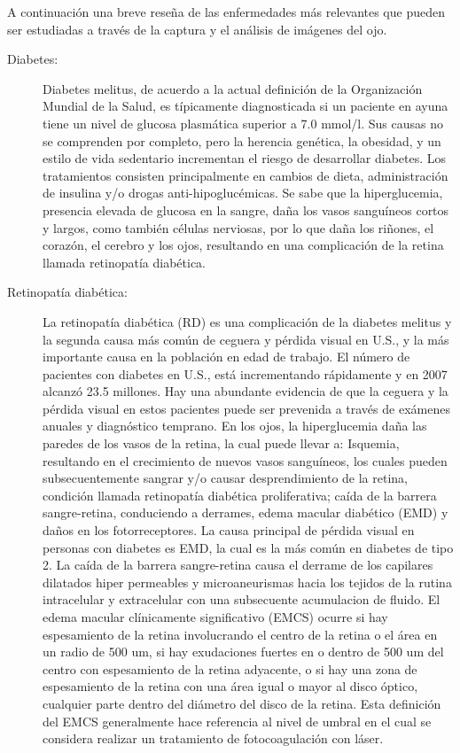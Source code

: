 A continuación una breve reseña de las enfermedades más relevantes que pueden ser estudiadas a través de la captura y el análisis de imágenes del ojo.

\begin{description}
    \item[Diabetes:] Diabetes melitus, de acuerdo a la actual definición de la Organización Mundial de la Salud, es típicamente diagnosticada si un paciente en ayuna tiene un nivel de glucosa plasmática superior a 7.0 mmol/l. Sus causas no se comprenden por completo, pero la herencia genética, la obesidad, y un estilo de vida sedentario incrementan el riesgo de desarrollar diabetes. Los tratamientos consisten principalmente en cambios de dieta, administración de insulina y/o drogas anti-hipoglucémicas. Se sabe que la hiperglucemia, presencia elevada de glucosa en la sangre, daña los vasos sanguíneos cortos y largos, como también células nerviosas, por lo que daña los riñones, el corazón, el cerebro y los ojos, resultando en una complicación de la retina llamada retinopatía diabética.
    \item[Retinopatía diabética:] La retinopatía diabética (RD) es una complicación de la diabetes melitus y la segunda causa más común de ceguera y pérdida visual en U.S., y la más importante causa en la población en edad de trabajo. El número de pacientes con diabetes en U.S., está incrementando rápidamente y en 2007 alcanzó 23.5 millones. Hay una abundante evidencia de que la ceguera y la pérdida visual en estos pacientes puede ser prevenida a través de exámenes anuales y  diagnóstico temprano. En los ojos, la hiperglucemia daña las paredes de los vasos de la retina, la cual puede llevar a:
Isquemia, resultando en el crecimiento de nuevos vasos sanguíneos, los cuales pueden subsecuentemente sangrar y/o causar desprendimiento de la retina, condición llamada retinopatía diabética proliferativa;
caída de la barrera sangre-retina, conduciendo a derrames, edema macular diabético (EMD) y daños en los fotorreceptores.
La causa principal de pérdida visual en personas con diabetes es EMD, la cual es la más común en diabetes de tipo 2. La caída de la barrera sangre-retina causa el derrame de los capilares dilatados hiper permeables y microaneurismas hacia los tejidos de la rutina intracelular y extracelular con una subsecuente acumulacion de fluido. El edema macular clínicamente significativo (EMCS) ocurre si hay espesamiento de la retina involucrando el centro de la retina o el área en un radio de 500 um, si hay exudaciones fuertes en o dentro de 500 um del centro con espesamiento de la retina adyacente, o si hay una zona de espesamiento de la retina con una área igual o mayor al disco óptico, cualquier parte dentro del diámetro del disco de la retina. Esta definición del EMCS generalmente hace referencia al nivel de umbral en el cual se considera realizar un tratamiento de fotocoagulación con láser. 

\end{description}
